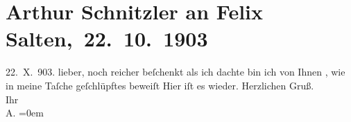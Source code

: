 

         
         \renewcommand{\erwaehntePersonen}{Personen: Felix Salten}
         \renewcommand{\erwaehnteOrte}{Orte: Wien}
         \renewcommand{\erwaehnteWerke}{}
               \section[ Arthur Schnitzler an Felix Salten, 22. 10. 1903]{ Arthur Schnitzler an Felix Salten, 22. 10. 1903}\nopagebreak{}\rehead{ }\begin{ledgroupsized}[t]{13cm}\normalsize\beginnumbering{} \toendnotes[C]{\smallbreak\pagebreak[2]} 
\toendnotes[C]{\smallbreak}\pstart
           \raggedleft{}{\pb}22. X. 903.\pend
           \pstart
           lieber, noch reicher beſchenkt als ich dachte bin ich von Ihnen
                  \label{K_L02987-1v}\label{K_L02987-1h}, wie \label{K_L02987-2v}\label{K_L02987-2h} in meine
               Taſche geſchlüpftes beweiſt\pend
           \pstart
           Hier iſt es wieder.\pend
           \pstart
           Herzlichen Gruß. {\\[\baselineskip]}Ihr {\\[\baselineskip]}\spacefill\mbox{A.}\pend
           \leftskip=0em{}
         
         \endnumbering{}\end{ledgroupsized}  \newcommand{\dateiname}{L02987}\newcommand{\titel}{Arthur Schnitzler an Felix Salten, 22. 10. 1903}\newcommand{\editorInnen}{Martin Anton Müller und Laura Untner}
      